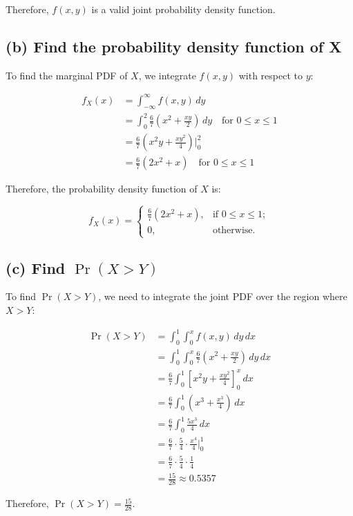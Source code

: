 \documentclass{article}
\begin{document}
Therefore, $f(x,y)$ is a valid joint probability density function.

\subsection*{(b) Find the probability density function of X}

To find the marginal PDF of $X$, we integrate $f(x,y)$ with respect to $y$:

\begin{align*}
f_X(x) &= \int_{-\infty}^{\infty} f(x,y) \, dy \\
&= \int_{0}^{2} \frac{6}{7}(x^2 + \frac{xy}{2}) \, dy \quad \text{for } 0 \leq x \leq 1 \\
&= \frac{6}{7}(x^2y + \frac{xy^2}{4})\bigg|_{0}^{2} \\
&= \frac{6}{7}(2x^2 + x) \quad \text{for } 0 \leq x \leq 1
\end{align*}

Therefore, the probability density function of $X$ is:

\[
f_X(x) = 
\begin{cases} 
\frac{6}{7}(2x^2 + x), & \text{if } 0 \leq x \leq 1; \\
0, & \text{otherwise}.
\end{cases}
\]

\subsection*{(c) Find $\Pr(X > Y)$}

To find $\Pr(X > Y)$, we need to integrate the joint PDF over the region where $X > Y$:

\begin{align*}
\Pr(X > Y) &= \int_{0}^{1}\int_{0}^{x} f(x,y) \, dy \, dx \\
&= \int_{0}^{1}\int_{0}^{x} \frac{6}{7}(x^2 + \frac{xy}{2}) \, dy \, dx \\
&= \frac{6}{7}\int_{0}^{1} [x^2y + \frac{xy^2}{4}]_{0}^{x} \, dx \\
&= \frac{6}{7}\int_{0}^{1} (x^3 + \frac{x^3}{4}) \, dx \\
&= \frac{6}{7}\int_{0}^{1} \frac{5x^3}{4} \, dx \\
&= \frac{6}{7} \cdot \frac{5}{4} \cdot \frac{x^4}{4}\bigg|_{0}^{1} \\
&= \frac{6}{7} \cdot \frac{5}{4} \cdot \frac{1}{4} \\
&= \frac{15}{28} \approx 0.5357
\end{align*}

Therefore, $\Pr(X > Y) = \frac{15}{28}$.
\end{document}
